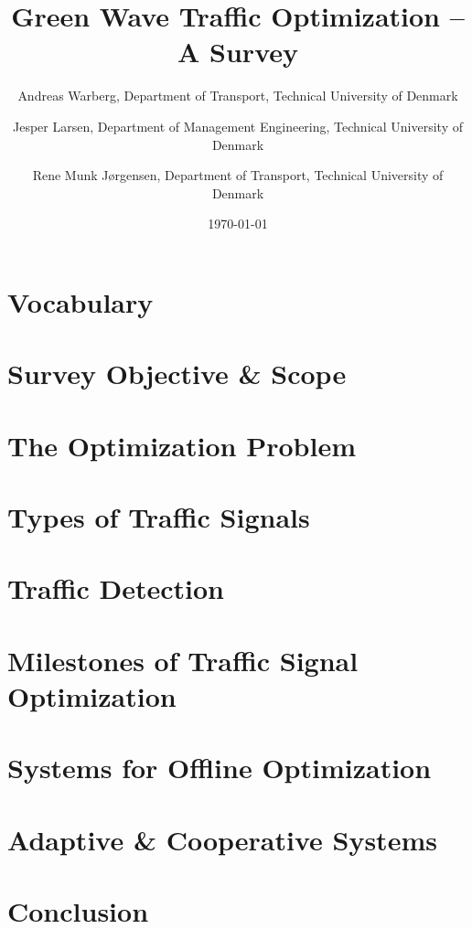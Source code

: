 \documentclass [a4paper, 11pt, titlepage] {article}
\title{Green Wave Traffic Optimization -- A Survey}
\author{Andreas Warberg, Department of Transport, Technical University of Denmark \and
Jesper Larsen, Department of Management Engineering, Technical University of Denmark \and Rene Munk J{\o}rgensen, Department of Transport, Technical University of Denmark}
\date{\today}
\begin{document}
\setlength{\parindent}{4mm}

\titlepage



\section{Vocabulary}


\section{Survey Objective \& Scope}


\section{The Optimization Problem}


\section{Types of Traffic Signals}


\section{Traffic Detection}


\section{Milestones of Traffic Signal Optimization}


\section{Systems for Offline Optimization}


\section{Adaptive \& Cooperative Systems}


%

\section{Conclusion}




\end{document}
